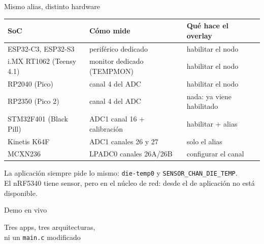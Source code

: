 \documentclass[aspectratio=169]{beamer}
\begin{document}
\begin{frame}{Mismo alias, distinto hardware}
\centering
\footnotesize
\begin{tabular}{lll}
\toprule
\textbf{SoC} & \textbf{Cómo mide} & \textbf{Qué hace el overlay} \\
\midrule
ESP32-C3, ESP32-S3 & periférico dedicado & habilitar el nodo \\
i.MX RT1062 (Teensy 4.1) & monitor dedicado (TEMPMON) & habilitar el nodo \\
RP2040 (Pico) & canal 4 del ADC & habilitar el nodo \\
RP2350 (Pico 2) & canal 4 del ADC & nada: ya viene habilitado \\
STM32F401 (Black Pill) & ADC1 canal 16 + calibración & habilitar + alias \\
Kinetis K64F & ADC1 canales 26 y 27 & solo el alias \\
MCXN236 & LPADC0 canales 26A/26B & \alert{configurar el canal} \\
\bottomrule
\end{tabular}

\vspace{0.8em}
\footnotesize La aplicación siempre pide lo mismo: \texttt{die-temp0} y \texttt{SENSOR\_CHAN\_DIE\_TEMP}.\\
El nRF5340 tiene sensor, pero en el núcleo de red: desde el de aplicación no está disponible.
\end{frame}

\begin{frame}[standout]
Demo en vivo

\Large Tres apps, tres arquitecturas,\\ni un \texttt{main.c} modificado
\end{frame}
\end{document}
